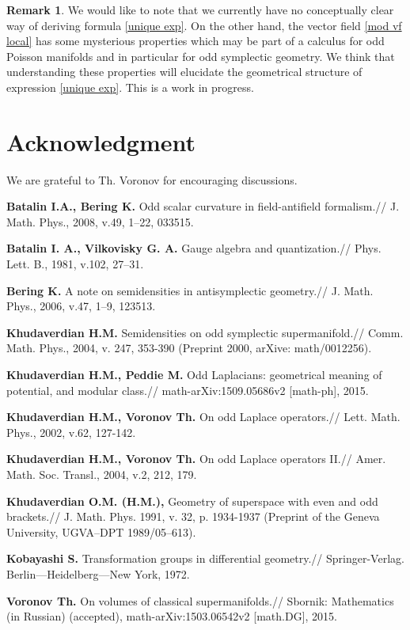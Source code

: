 \documentclass[12pt,reqno,a4paper]{amsart}
\theoremstyle{definition}
\newtheorem{remark}{Remark}
\begin{document}
\begin{remark}
We would like to note that we currently have no
conceptually clear way of deriving formula \eqref{unique exp}.
On the other hand, the
vector field \eqref{mod vf local} has some mysterious
properties which may be part of a calculus for odd
Poisson manifolds and in particular for odd symplectic
geometry. We think that understanding these properties
 will elucidate the geometrical structure of
expression \eqref{unique exp}.
 This is a work in progress.
\end{remark}

\section*{Acknowledgment}
We are grateful to Th. Voronov for encouraging discussions.

\begin{thebibliography}{99}

\textbf{Batalin I.A., Bering K.} Odd scalar curvature in field-antifield formalism.//
J. Math. Phys., 2008, v.49, 1--22, 033515.

\textbf{Batalin I. A., Vilkovisky G. A.} Gauge algebra and quantization.//
Phys. Lett. B., 1981, v.102, 27--31.

\textbf{Bering K.} A note on semidensities in antisymplectic geometry.//
J. Math. Phys., 2006, v.47, 1--9, 123513.

\textbf{Khudaverdian H.M.} Semidensities on odd symplectic supermanifold.//
Comm. Math. Phys., 2004, v. 247, 353-390 (Preprint 2000, arXive: math/0012256).

\textbf{Khudaverdian H.M., Peddie M.} Odd Laplacians: geometrical meaning of potential, and modular class.// math-arXiv:1509.05686v2 [math-ph], 2015.

\textbf{Khudaverdian H.M., Voronov Th.} On odd Laplace operators.//
Lett. Math. Phys., 2002, v.62, 127-142.

\textbf{Khudaverdian H.M., Voronov Th.}
On odd Laplace operators II.//
Amer. Math. Soc. Transl., 2004, v.2, 212, 179.

\textbf{Khudaverdian O.M. (H.M.),}
Geometry of superspace with even and odd brackets.//
    J. Math. Phys. 1991, v. 32, p. 1934-1937
  (Preprint of the Geneva University, UGVA--DPT 1989/05--613).

\textbf{Kobayashi S.} Transformation groups in
differential geometry.//
 Springer-Verlag. Berlin---Heidelberg---New York, 1972.

\textbf{Voronov Th.} On volumes of classical
supermanifolds.// Sbornik: Mathematics (in Russian) (accepted),
 math-arXiv:1503.06542v2 [math.DG], 2015.

\end{thebibliography}
\end{document}
